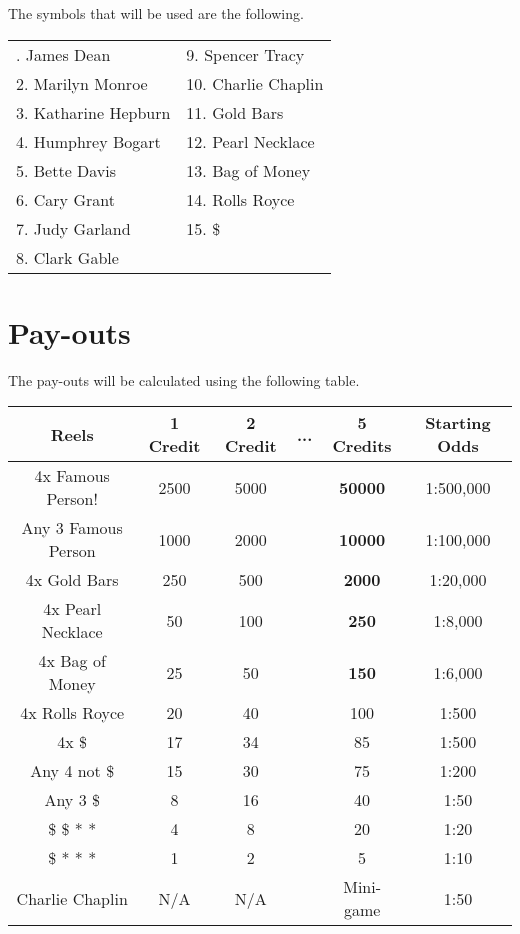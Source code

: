 The symbols that will be used are the following.

\begin{center}
\begin{tabular}{ l l }
  \centering
   1. James Dean &         9. Spencer Tracy \\ 
   2. Marilyn Monroe &     10. Charlie Chaplin \\ 
   3. Katharine Hepburn &  11. Gold Bars \\    
   4. Humphrey Bogart &    12. Pearl Necklace \\
   5. Bette Davis &        13. Bag of Money \\
   6. Cary Grant &         14. Rolls Royce \\
   7. Judy Garland &       15. \$ \\
   8. Clark Gable &
\end{tabular}
\end{center}

\section{Pay-outs}

The pay-outs will be calculated using the following table.

\begin{center}
\begin{tabular}{| c | c | c | c | c | c |}
  \hline
  Reels                   & 1 Credit  & 2 Credit & ... & 5 Credits & Starting Odds \\ \hline
  4x Famous Person!       & 2500 & 5000 & & {\bf \large 50000} & 1:500,000 \\ \hline
  Any 3 Famous Person     & 1000 & 2000 & & {\bf 10000} & 1:100,000 \\ \hline
  4x Gold Bars            & 250 & 500 & & {\bf 2000} & 1:20,000 \\ \hline
  4x Pearl Necklace       & 50 & 100 & & {\bf 250} & 1:8,000 \\ \hline
  4x Bag of Money         & 25 & 50 & & {\bf 150} & 1:6,000 \\ \hline
  4x Rolls Royce          & 20 & 40 & & 100 & 1:500 \\ \hline
  4x \$                   & 17 & 34 & & 85 & 1:500 \\ \hline
  Any 4 not \$            & 15 & 30 & & 75 & 1:200 \\ \hline
  Any 3 \$                & 8 & 16 & & 40 & 1:50 \\ \hline
  \$ \$ * *               & 4 & 8 & & 20 & 1:20 \\ \hline
  \$ * * *                & 1 & 2 & & 5 & 1:10 \\ \hline
  Charlie Chaplin         & N/A & N/A & & Mini-game & 1:50 \\ \hline
\end{tabular}
\end{center}

